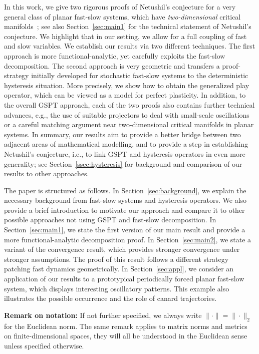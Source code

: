 \documentclass[12pt]{article}
\begin{document}
In this work, we give two rigorous proofs of Netushil's conjecture for a very general class
of planar fast-slow systems, which have \emph{two-dimensional} critical 
manifolds~\cite{PokrovskiiSobolev}; see also Section~\ref{sec:main1} 
for the technical statement of Netushil's conjecture. We highlight that in our setting,
we allow for a full coupling of fast and slow variables. We
establish our results via two different techniques. The first approach is more 
functional-analytic, yet carefully exploits the fast-slow decomposition. The second
approach is very geometric and transfers a proof-strategy initially developed for
stochastic fast-slow systems to the deterministic hysteresis situation. More precisely, 
we show how to obtain the generalized play operator, which can be viewed as a model 
for perfect plasticity. In addition, to the overall GSPT approach, each of the two 
proofs also contains further technical advances, e.g., the use of suitable projectors
to deal with small-scale oscillations or a careful matching argument near two-dimensional
critical manifolds in planar systems. In summary, our results aim to provide a 
better bridge between two adjacent areas of mathematical modelling, and to provide a 
step in establishing Netushil's conjecture, i.e., to link GSPT and hysteresis operators 
in even more generality; see Section~\ref{ssec:hysteresis} for background and 
comparison of our results to other approaches.\medskip

The paper is structured as follows. In Section~\ref{sec:background}, we explain 
the necessary background from fast-slow systems and hysteresis operators. We also 
provide a brief introduction to motivate our approach and compare it to other possible 
approaches not using GSPT and fast-slow decomposition. In Section~\ref{sec:main1}, 
we state the first version of our main result and provide a more functional-analytic 
decomposition proof. In Section~\ref{sec:main2}, we state a variant of the 
convergence result, which provides stronger convergence under stronger 
assumptions. The proof of this result follows a different strategy patching 
fast dynamics geometrically. In Section~\ref{sec:appl}, we consider an 
application of our results to a prototypical periodically forced planar fast-slow 
system, which displays interesting oscillatory patterns. This example also illustrates
the possible occurrence and the role of canard trajectories.\medskip

\textbf{Remark on notation:} If not further specified, we always write 
$\|\cdot\|=\|\cdot\|_2$ for the Euclidean norm. The same remark applies to matrix
norms and metrics on finite-dimensional spaces, they will all be understood in the 
Euclidean sense unless specified otherwise. 
\end{document}
